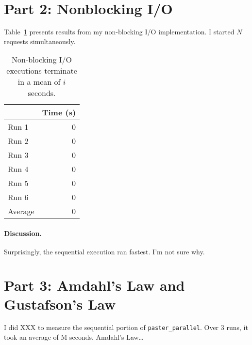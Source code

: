 \documentclass[12pt]{article}
\begin{document}
\section*{Part 2: Nonblocking I/O}

Table~\ref{tbl_nbio} presents results from my non-blocking I/O implementation. I started $N$ requests
simultaneously.

\begin{table}[H]
  \centering
  \begin{tabular}{lr}
    & {\bf Time (s)} \\
    \hline
    Run 1 & 0 \\
    Run 2 & 0 \\
    Run 3 & 0 \\
    Run 4 & 0 \\
    Run 5 & 0 \\
    Run 6 & 0 \\
    \hline
    Average & 0 \\
  \end{tabular}
  \caption{\label{tbl_nbio}Non-blocking I/O executions terminate in a mean of $i$ seconds.}
\end{table}

\paragraph{Discussion.} Surprisingly, the sequential execution ran fastest. I'm
not sure why.

\section*{Part 3: Amdahl's Law and Gustafson's Law}
I did XXX to measure the sequential portion of {\tt paster\_parallel}. Over 3 runs,
it took an average of M seconds. Amdahl's Law\ldots
\end{document}
